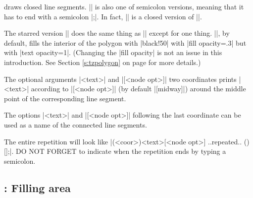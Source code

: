 \icmd{\tzpolygon} draws closed line segments. |\tzpolygon| is also one of semicolon versions, meaning that it has to end with a semicolon |;|.
In fact, |\tzpolygon| is a closed version of |\tzlines|.

The starred version |\tzpolygon*| does the same thing as |\tzpolgon| except for one thing.
|\tzplygon*|, by default, fills the interior of the polygon with |black!50| with |fill opacity=.3| but with |text opacity=1|. (Changing the |fill opacity| is not an issue in this introduction. See Section \ref{s:tzpolygon} on page \pageref{s:tzpolygon} for more details.) 

\begin{tzcode}{.3}
\end{tzcode}

The optional arguments |{<text>}| and |[<node opt>]|  two coordinates prints |<text>| according to |[<node opt>]| (by default |[midway]|) around the middle point of the corresponding line segment.

\begin{tzcode}{.3}
\end{tzcode}

The options |{<text>}| and |[<node opt>]| following the last coordinate can be used as a name of the connected line segments. 

The entire repetition will look like |(<coor>){<text>}[<node opt>] ..repeated.. (){}[];|.
DO NOT FORGET to indicate when the repetition ends by typing a semicolon.

\begin{tzcode}{.3}
\end{tzcode}

\subsection{\protect\cmd{\tzpath*}: Filling area}
\label{ssi:tzpath}

